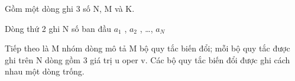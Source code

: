 Gồm một dòng ghi 3 số N, M và K.  

   Dòng thứ 2 ghi N số ban đầu $a_{1}$   , $a_{2}$   , …, $a_{N}$

    Tiếp theo là M nhóm dòng mô tả M bộ quy tắc biến đổi; mỗi bộ quy tắc được ghi trên N dòng gồm 3 giá trị u oper v. Các bộ quy tắc biến đổi được ghi cách nhau một dòng trống.